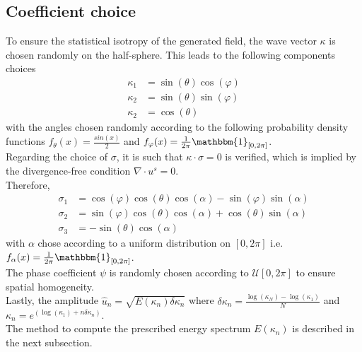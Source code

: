 \documentclass[a4paper,12pt]{article}
\theoremstyle{definition}
\begin{document}
\subsection{Coefficient choice}
To ensure the statistical isotropy of the generated field, the wave vector $\kappa$ is chosen randomly on the half-sphere.
This leads to the following components choices
\begin{align}
    \kappa_1 &= \sin(\theta)\cos(\varphi) \\
    \kappa_2 &= \sin(\theta)\sin(\varphi) \\
    \kappa_2 & = \cos(\theta)
\end{align}
with the angles chosen randomly according to the following probability density functions $f_\theta(x)=\frac{sin(x)}{2}$ and $f_\varphi(x)=\frac{1}{2\pi}\mathbbm{1}_{[0,2\pi]}$. \\
Regarding the choice of $\sigma$, it is such that $\kappa\cdot\sigma=0$ is verified, which is implied by the divergence-free condition $\nabla\cdot u^s=0$. \\
Therefore, 
\begin{align}
    \sigma_1&=\cos(\varphi)\cos(\theta)\cos(\alpha)-\sin(\varphi)\sin(\alpha) \\
    \sigma_2&=\sin(\varphi)\cos(\theta)\cos(\alpha)+\cos(\theta)\sin(\alpha) \\
    \sigma_3&=-\sin(\theta)\cos(\alpha)
\end{align}
with $\alpha$ chose according to a uniform distribution on $[0,2\pi]$ i.e. $f_\alpha(x)=\frac{1}{2\pi}\mathbbm{1}_{[0,2\pi]}$. \\
The phase coefficient $\psi$ is randomly chosen according to $\mathcal{U}[0,2\pi]$ to ensure spatial homogeneity. \\
Lastly, the amplitude $\hat{u}_n=\sqrt{E(\kappa_n)\delta \kappa_n}$ where $\delta \kappa_n = \frac{\log(\kappa_N)-\log(\kappa_1)}{N}$ and $\kappa_n=e^{(\log(\kappa_1)+n\delta \kappa_n)}$. \\
The method to compute the prescribed energy spectrum $E(\kappa_n)$ is described in the next subsection.
\end{document}
